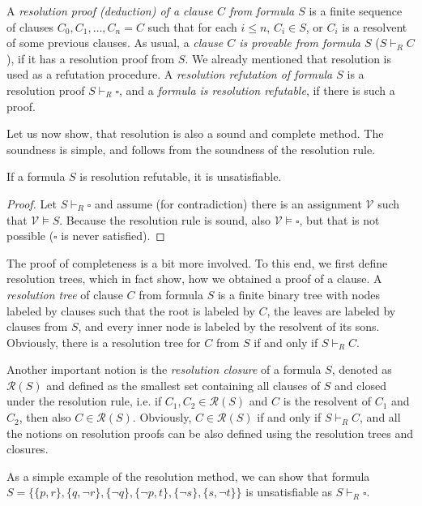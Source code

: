 A \emph{resolution proof (deduction) of a clause $C$ from formula $S$} is a finite sequence of clauses $C_0, C_1, \dots, C_n = C$ such that for each $i \leq n$, $C_i \in S$, or $C_i$ is a resolvent of some previous clauses. As usual, a \emph{clause $C$ is provable from formula $S$} ($S \vdash_R C$), if it has a resolution proof from $S$. We already mentioned that resolution is used as a refutation procedure. A \emph{resolution refutation of formula $S$} is a resolution proof $S \vdash_R \square$, and a \emph{formula is resolution refutable}, if there is such a proof.

Let us now show, that resolution is also a sound and complete method. The soundness is simple, and follows from the soundness of the resolution rule.

\begin{theorem}
If a formula $S$ is resolution refutable, it is unsatisfiable.
\end{theorem}
\begin{proof}
Let $S \vdash_R \square$ and assume (for contradiction) there is an assignment $\mathcal{V}$ such that $\mathcal{V} \vDash S$. Because the resolution rule is sound, also $\mathcal{V} \vDash \square$, but that is not possible ($\square$ is never satisfied).
\end{proof}

The proof of completeness is a bit more involved. To this end, we first define resolution trees, which in fact show, how we obtained a proof of a clause. A \emph{resolution tree} of clause $C$ from formula $S$ is a finite binary tree with nodes labeled by clauses such that the root is labeled by $C$, the leaves are labeled by clauses from $S$, and every inner node is labeled by the resolvent of its sons. Obviously, there is a resolution tree for $C$ from $S$ if and only if $S \vdash_R C$.

Another important notion is the \emph{resolution closure} of a formula $S$, denoted as $\mathcal{R}(S)$ and defined as the smallest set containing all clauses of $S$ and closed under the resolution rule, i.e. if $C_1, C_2 \in \mathcal{R}(S)$ and $C$ is the resolvent of $C_1$ and $C_2$, then also $C \in \mathcal{R}(S)$. Obviously, $C \in \mathcal{R}(S)$ if and only if $S \vdash_R C$, and all the notions on resolution proofs can be also defined using the resolution trees and closures.

As a simple example of the resolution method, we can show that formula $S = \{\{p, r\}, \{q, \neg r\}, \{\neg q\}, \{\neg p, t\}, \{\neg s\}, \{s, \neg t\}\}$ is unsatisfiable as $S \vdash_R \square$.

